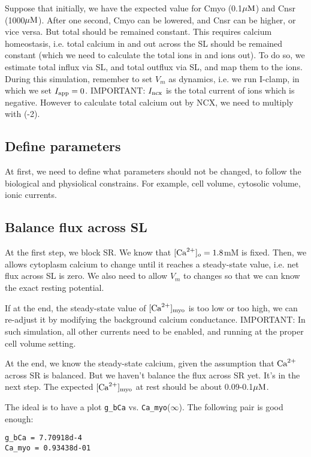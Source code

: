 Suppose that initially, we have the expected value for Cmyo (0.1${\mu\text{M}}$) and Cnsr
(1000${\mu\text{M}}$). After one second, Cmyo can be lowered, and Cnsr can be higher, or
vice versa. But total should be remained constant. This requires calcium
homeostasis, i.e. total calcium in and out across the SL should be remained
constant (which we need to calculate the total ions in and ions out). To do so,
we estimate total influx via SL, and total outflux via SL, and map them to the
ions. During this simulation, remember to set $V_m$ as dynamics, i.e. we run
I-clamp, in which we set $I_{\text{app}}=0$. IMPORTANT: $I_{\text{ncx}}$ is the total current of
ions which is negative. However to calculate total calcium out by NCX, we need
to multiply with (-2).

\subsection{Define parameters}

At first, we need to define what parameters should not be changed, to follow the
biological and physiolical constrains. For example, cell volume, cytosolic
volume, ionic currents. 

\subsection{Balance flux across SL}

At the first step, we block SR. We know that $[{\text{Ca}^{2+}}]_o=1.8$mM is fixed. Then, we
allows cytoplasm calcium to change until it reaches a steady-state value, i.e.
net flux across SL is zero. We also need to allow $V_m$ to changes so that we
can know the exact resting potential. 

If at the end, the steady-state value of $[{\text{Ca}^{2+}}]_{\text{myo}}$ is too low or too high, we
can re-adjust it by modifying the background calcium conductance. IMPORTANT: In
such simulation, all other currents need to be enabled, and running at the
proper cell volume setting. 

At the end, we know the steady-state calcium, given the assumption that ${\text{Ca}^{2+}}$
across SR is balanced. But we haven't balance the flux across SR yet. It's in
the next step. The expected $[{\text{Ca}^{2+}}]_{\text{myo}}$ at rest should be about 0.09-0.1${\mu\text{M}}$.

The ideal is to have a plot \verb!g_bCa! vs. \verb!Ca_myo!($\infty$).
The following pair is good enough: 
\begin{verbatim}
g_bCa = 7.70918d-4
Ca_myo = 0.93438d-01
\end{verbatim} 

